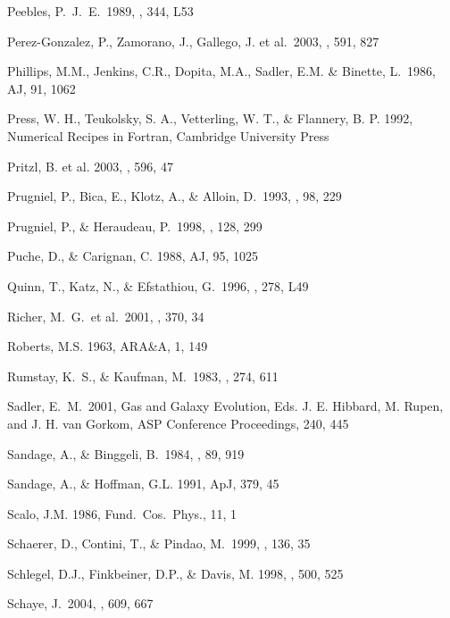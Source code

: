 \documentclass[12pt,preprint]{emulateapj}
\begin{document}
\begin{thebibliography}{}
Peebles, P.~J.~E.\ 1989, \apjl, 344, L53 

Perez-Gonzalez, P., Zamorano, J., Gallego, J. et al.\ 2003, \apj, 591, 827 

Phillips, M.M., Jenkins, C.R., Dopita, M.A., Sadler, E.M. \& Binette, L.\ 1986, AJ, 91, 1062

Press, W. H., Teukolsky, S. A., Vetterling, W. T., \& Flannery, B. P. 1992,
Numerical Recipes in Fortran, Cambridge University Press

Pritzl, B. et al. 2003, \apj, 596, 47

Prugniel, P., Bica, E., Klotz, A., \& Alloin, D.\ 1993, \aaps, 98, 229 

Prugniel, P., \& Heraudeau, P.\ 1998, \aaps, 128, 299 

Puche, D., \& Carignan, C. 1988, AJ, 95, 1025

Quinn, T., Katz, N., \& Efstathiou, G.\ 1996, \mnras, 278, L49 

Richer, M.~G.~et al.\ 2001, \aap, 370, 34 

Roberts, M.S. 1963, ARA\&A, 1, 149

Rumstay, K.~S., \& Kaufman, M.\ 1983, \apj, 274, 611 

Sadler, E.~M.\ 2001, Gas and Galaxy Evolution, 
Eds. J. E. Hibbard, M. Rupen, and J. H. van Gorkom,
ASP Conference Proceedings, 240, 445 

Sandage, A., \& Binggeli, B.\ 1984, \aj, 89, 919

Sandage, A., \& Hoffman, G.L. 1991, ApJ, 379, 45

Scalo, J.M. 1986, Fund.\ Cos.\ Phys., 11, 1

Schaerer, D., Contini, T., \& Pindao, M.\ 1999, \aaps, 136, 35 

Schlegel, D.J., Finkbeiner, D.P., \& Davis, M. 1998, \apj , 500, 525

Schaye, J.\ 2004, \apj, 609, 667 


\end{thebibliography}
\end{document}
